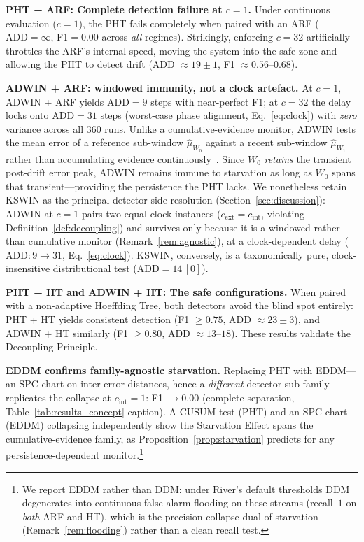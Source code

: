 \documentclass[10pt,conference]{IEEEtran}
\theoremstyle{definition}
\begin{document}


\textbf{PHT + ARF: Complete detection failure at $c{=}1$.}
Under continuous evaluation ($c{=}1$), the PHT fails completely when paired with an ARF ($\mathrm{ADD}{=}\infty$, F1${=}0.00$ across \emph{all} regimes).
Strikingly, enforcing $c{=}32$ artificially throttles the ARF's internal speed, moving the system into the safe zone and allowing the PHT to detect drift (ADD ${\approx}19{\pm}1$, F1 ${\approx}0.56$--$0.68$).

\textbf{ADWIN + ARF: windowed immunity, not a clock artefact.}
At $c = 1$, ADWIN + ARF yields $\mathrm{ADD} = 9$ steps with near-perfect F1; at $c = 32$ the delay locks onto $\mathrm{ADD} = 31$ steps (worst-case phase alignment, Eq.~\eqref{eq:clock}) with \emph{zero} variance across all 360 runs.
Unlike a cumulative-evidence monitor, ADWIN tests the mean error of a reference sub-window $\hat{\mu}_{W_0}$ against a recent sub-window $\hat{\mu}_{W_1}$ rather than accumulating evidence continuously~\cite{bifet_adwin_2007}.
Since $W_0$ \emph{retains} the transient post-drift error peak, ADWIN remains immune to starvation as long as $W_0$ spans that transient---providing the persistence the PHT lacks.
We nonetheless retain KSWIN as the principal detector-side resolution (Section~\ref{sec:discussion}): ADWIN at $c = 1$ pairs two equal-clock instances ($c_{\mathrm{ext}} = c_{\mathrm{int}}$, violating Definition~\ref{def:decoupling}) and survives only because it is a windowed rather than cumulative monitor (Remark~\ref{rem:agnostic}), at a clock-dependent delay ($\mathrm{ADD}: 9 \to 31$, Eq.~\eqref{eq:clock}). KSWIN, conversely, is a taxonomically pure, clock-insensitive distributional test ($\mathrm{ADD} = 14\,[0]$).

\textbf{PHT + HT and ADWIN + HT: The safe configurations.}
When paired with a non-adaptive Hoeffding Tree, both detectors avoid the blind spot entirely: PHT + HT yields consistent detection (F1 $\ge 0.75$, ADD $\approx 23 \pm 3$), and ADWIN + HT similarly (F1 $\ge 0.80$, ADD $\approx 13$--$18$).
These results validate the Decoupling Principle.

\textbf{EDDM confirms family-agnostic starvation.}
Replacing PHT with EDDM---an SPC chart on inter-error distances, hence a \emph{different} detector sub-family---replicates the collapse at $c_{\mathrm{int}} = 1$: F1 $\to 0.00$ (complete separation, Table~\ref{tab:results_concept} caption). A CUSUM test (PHT) and an SPC chart (EDDM) collapsing independently show the Starvation Effect spans the cumulative-evidence family, as Proposition~\ref{prop:starvation} predicts for any persistence-dependent monitor.\footnote{We report EDDM rather than DDM: under River's default thresholds DDM degenerates into continuous false-alarm flooding on these streams (recall~$1$ on \emph{both} ARF and HT), which is the precision-collapse dual of starvation (Remark~\ref{rem:flooding}) rather than a clean recall test.}
\end{document}
